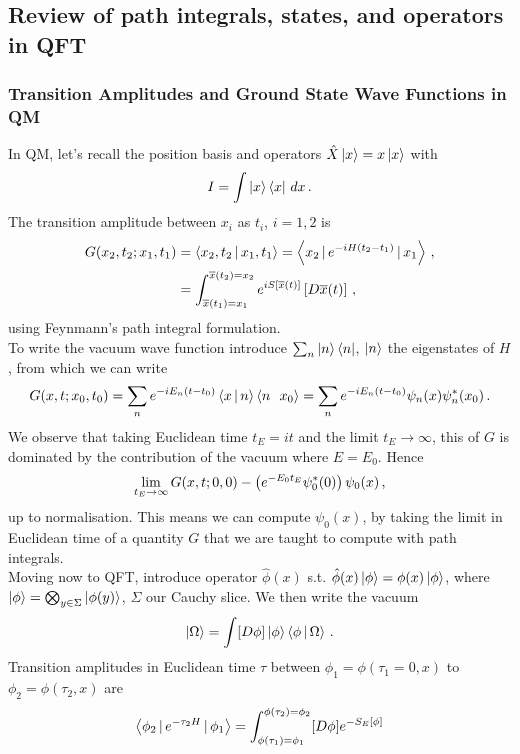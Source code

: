 \documentclass{article}
\begin{document}
\subsection{Review of path integrals, states, and operators in QFT}
\subsubsection{Transition Amplitudes and Ground State Wave Functions in QM}
In QM, let's recall the position basis and operators $\hat{X} \ket{x} = x \ket{x}$ with 
\[
I = \int \ket{x} \bra{x} \, dx \, .
\]
The transition amplitude between $x_i$ as $t_i$, $i=1,2$ is 
\begin{align*}
G(x_2, t_2; x_1, t_1) &= \left\langle x_2, t_2 \, | \, x_1, t_1 \right\rangle = \left\langle x_2 \, | \, e^{-iH(t_2-t_1)} \, | \, x_1 \right\rangle \, , \\
&= \int_{\overline{x}(t_1)=x_1}^{\overline{x}(t_2) = x_2} e^{iS[\overline{x}(t)]} \left[ D \overline{x}(t) \right] \, , 
\end{align*}
using Feynmann's path integral formulation. \\
To write the vacuum wave function introduce $\sum_n \ket{n} \bra{n}$, $\ket{n}$ the eigenstates of $H$, from which we can write 
\[
G(x,t; x_0, t_0) = \sum_n e^{-iE_n(t-t_0)} \left\langle x \, | \, n \right\rangle \left\langle n \, \ \, x_0 \right\rangle = \sum_n e^{-iE_n(t-t_0)}  \psi_n(x) \psi_n^\ast (x_0) \, .
\] 
We observe that taking Euclidean time $t_E = it$ and the limit $t_E \to \infty$, this of $G$ is dominated by the contribution of the vacuum where $E=E_0$. Hence 
\[
\lim_{t_E \to \infty} G(x,t; 0,0) - \left( e^{-E_0 t_E}\psi_0^\ast(0) \right) \psi_0(x) \, ,
\]
up to normalisation. This means we can compute $\psi_0(x)$, by taking the limit in Euclidean time of a quantity $G$ that we are taught to compute with path integrals. \\
Moving now to QFT, introduce operator $\hat{\phi}(x)$ s.t. $\hat{\phi}(x) \ket{\phi} = \phi(x) \ket{\phi}$, where $\ket{\phi} = \bigotimes_{y \in \Sigma} \ket{\phi(y)}$, $\Sigma$ our Cauchy slice. We then write the vacuum 
\[
\ket{\Omega} = \int [D\phi] \ket{\phi} \left\langle \phi \, | \, \Omega \right\rangle \, .
\]
Transition amplitudes in Euclidean time $\tau$ between $\phi_1 = \phi(\tau_1=0, x)$ to $\phi_2=\phi(\tau_2, x)$ are
\begin{align*}
	\left\langle \phi_2 \, | \, e^{-\tau_2 H} \, | \, \phi_1 \right\rangle = \int_{\phi(\tau_1) = \phi_1}^{\phi(\tau_2) = \phi_2} [D\phi] e^{-S_E[\phi]}
\end{align*}
\end{document}

